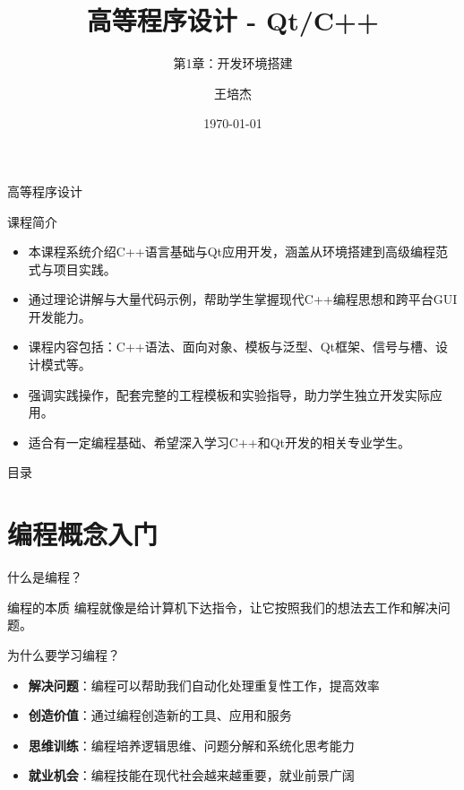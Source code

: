 \documentclass[UTF8,aspectratio=169]{beamer}
\title{高等程序设计 - Qt/C++}
\subtitle{第1章：开发环境搭建}
\author{王培杰}
\institute{长江大学地球物理与石油资源学院}
\date{\today}
\begin{document}
\begin{frame}
    \titlepage
\end{frame}

\begin{frame}{高等程序设计}
    \begin{ytublock}{课程简介}
        \begin{itemize}
            \item 本课程系统介绍C++语言基础与Qt应用开发，涵盖从环境搭建到高级编程范式与项目实践。
            \item 通过理论讲解与大量代码示例，帮助学生掌握现代C++编程思想和跨平台GUI开发能力。
            \item 课程内容包括：C++语法、面向对象、模板与泛型、Qt框架、信号与槽、设计模式等。
            \item 强调实践操作，配套完整的工程模板和实验指导，助力学生独立开发实际应用。
            \item 适合有一定编程基础、希望深入学习C++和Qt开发的相关专业学生。
        \end{itemize}
    \end{ytublock}
\end{frame}

\begin{frame}{目录}
    \begin{multicols}{2}
        \tableofcontents[]
    \end{multicols}
\end{frame}

\section{编程概念入门}

\begin{frame}{什么是编程？}
    \begin{ytublock}{编程的本质}
        编程就像是给计算机下达指令，让它按照我们的想法去工作和解决问题。
    \end{ytublock}

    \begin{ytublock}{为什么要学习编程？}
        \begin{itemize}
            \item \textbf{解决问题}：编程可以帮助我们自动化处理重复性工作，提高效率
            \item \textbf{创造价值}：通过编程创造新的工具、应用和服务
            \item \textbf{思维训练}：编程培养逻辑思维、问题分解和系统化思考能力
            \item \textbf{就业机会}：编程技能在现代社会越来越重要，就业前景广阔
        \end{itemize}
    \end{ytublock}
\end{frame}
\end{document}
